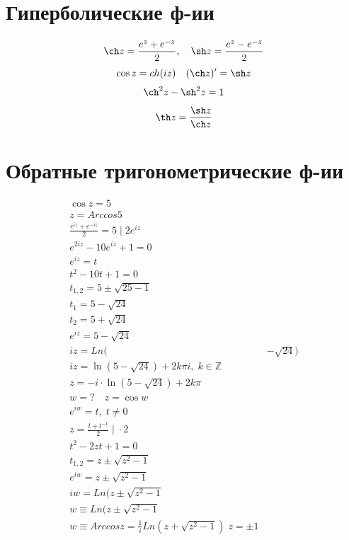 \documentclass[a4paper]{article}
\begin{document}
\section*{Гиперболические ф-ии}

\[
    \ch z = \frac{e^{z}+e^{-z}}{2}, \quad \sh z = \frac{e^{z}-e^{-z}}{2}  
\]
\[
    \cos z = ch(iz) \quad (\ch z)' = \sh z
\]
\[
    \ch^2 z - \sh^2 z = 1
\]
\[
    \th z = \frac{\sh z}{\ch z} 
\]
\section*{Обратные тригонометрические ф-ии}

\begin{equation*}
    \begin{aligned}
        \cos z = 5\\
        z = Arccos 5 \\
        \frac{e^{iz} + e^{-iz}}{2} = 5 \; | \; 2 e^{iz}\\
        e^{2iz} - 10 e^{iz} + 1 = 0 \\
        e^{iz}= t \\
        t^2 - 10 t + 1 = 0\\
        t_{1,2}  = 5 \pm \sqrt{25-1} \\
        t_1 = 5 - \sqrt{24} \\
        t_2 = 5 + \sqrt{24} \\
        e^{iz} = 5 - \sqrt{24} \\
        iz = Ln(& - \sqrt{24})\\
        iz = \ln (5 - \sqrt{24}) + 2k \pi i, \; k \in \mathbb{Z}\\
        z = -i \cdot \ln(5-\sqrt{24}) + 2k \pi\\
        w = ? \quad z = \cos w\\
        e^{iw} = t, \; t \neq 0 \\
        z = \frac{t + t^{-1}}{2} \; | \; \cdot 2 \\
        t^{2} - 2zt + 1 = 0 \\
        t_{1,2}= z \pm \sqrt{z^2 - 1} \\
        e^{iw} = z \pm \sqrt{z^2 - 1} \\
        iw = Ln(z \pm \sqrt{z^2 - 1} \\
        w \equiv Ln(z \pm \sqrt{z^2 -1} \\
        w \equiv Arccos z = \frac{1}{i} Ln(z + \sqrt{z^2 -1} ) \; z = \pm 1\\
    \end{aligned}
\end{equation*}
\end{document}
